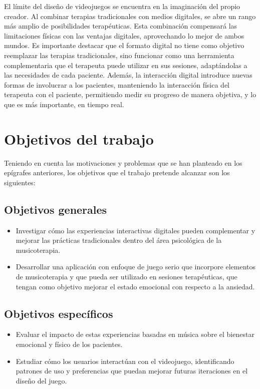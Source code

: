 El límite del diseño de videojuegos se encuentra en la imaginación del propio creador. Al combinar terapias tradicionales con medios digitales, se abre un rango más amplio de posibilidades terapéuticas. Esta combinación compensará las limitaciones físicas con las ventajas digitales, aprovechando lo mejor de ambos mundos. Es importante destacar que el formato digital no tiene como objetivo reemplazar las terapias tradicionales, sino funcionar como una herramienta complementaria que el terapeuta puede utilizar en sus sesiones, adaptándolas a las necesidades de cada paciente. Además, la interacción digital introduce nuevas formas de involucrar a los pacientes, manteniendo la interacción física del terapeuta con el paciente, permitiendo medir su progreso de manera objetiva, y lo que es más importante, en tiempo real.

\section{Objetivos del trabajo}

Teniendo en cuenta las motivaciones y problemas que se han planteado en los epígrafes anteriores, los objetivos que el trabajo pretende alcanzar son los siguientes:

\subsection{Objetivos generales}

\begin{itemize}
	\item Investigar cómo las experiencias interactivas digitales pueden complementar y mejorar las prácticas tradicionales dentro del área psicológica de la musicoterapia.
	\item Desarrollar una aplicación con enfoque de juego serio que incorpore elementos de musicoterapia y que pueda ser utilizado en sesiones terapéuticas, que tengan como objetivo mejorar el estado emocional con respecto a la ansiedad.
\end{itemize}

\subsection{Objetivos específicos}

\begin{itemize}
	\item Evaluar el impacto de estas experiencias basadas en música sobre el bienestar emocional y físico de los pacientes.
	\item Estudiar cómo los usuarios interactúan con el videojuego, identificando patrones de uso y preferencias que puedan mejorar futuras iteraciones en el diseño del juego.
\end{itemize}